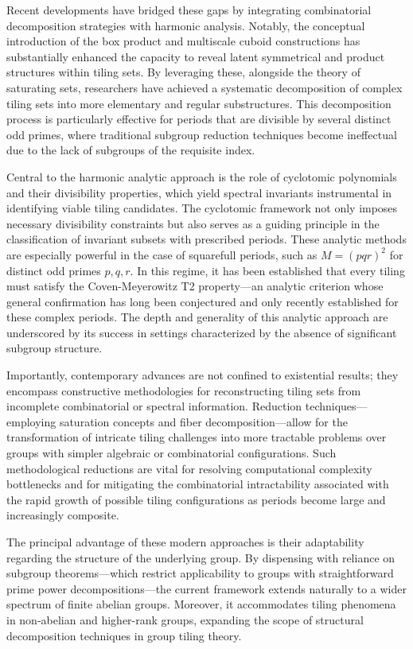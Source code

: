 Recent developments have bridged these gaps by integrating combinatorial decomposition strategies with harmonic analysis. Notably, the conceptual introduction of the box product and multiscale cuboid constructions has substantially enhanced the capacity to reveal latent symmetrical and product structures within tiling sets. By leveraging these, alongside the theory of saturating sets, researchers have achieved a systematic decomposition of complex tiling sets into more elementary and regular substructures. This decomposition process is particularly effective for periods that are divisible by several distinct odd primes, where traditional subgroup reduction techniques become ineffectual due to the lack of subgroups of the requisite index.

Central to the harmonic analytic approach is the role of cyclotomic polynomials and their divisibility properties, which yield spectral invariants instrumental in identifying viable tiling candidates. The cyclotomic framework not only imposes necessary divisibility constraints but also serves as a guiding principle in the classification of invariant subsets with prescribed periods. These analytic methods are especially powerful in the case of squarefull periods, such as \( M = (pqr)^2 \) for distinct odd primes \( p, q, r \). In this regime, it has been established that every tiling must satisfy the Coven-Meyerowitz T2 property---an analytic criterion whose general confirmation has long been conjectured and only recently established for these complex periods. The depth and generality of this analytic approach are underscored by its success in settings characterized by the absence of significant subgroup structure.

Importantly, contemporary advances are not confined to existential results; they encompass constructive methodologies for reconstructing tiling sets from incomplete combinatorial or spectral information. Reduction techniques---employing saturation concepts and fiber decomposition---allow for the transformation of intricate tiling challenges into more tractable problems over groups with simpler algebraic or combinatorial configurations. Such methodological reductions are vital for resolving computational complexity bottlenecks and for mitigating the combinatorial intractability associated with the rapid growth of possible tiling configurations as periods become large and increasingly composite.

The principal advantage of these modern approaches is their adaptability regarding the structure of the underlying group. By dispensing with reliance on subgroup theorems---which restrict applicability to groups with straightforward prime power decompositions---the current framework extends naturally to a wider spectrum of finite abelian groups. Moreover, it accommodates tiling phenomena in non-abelian and higher-rank groups, expanding the scope of structural decomposition techniques in group tiling theory.

